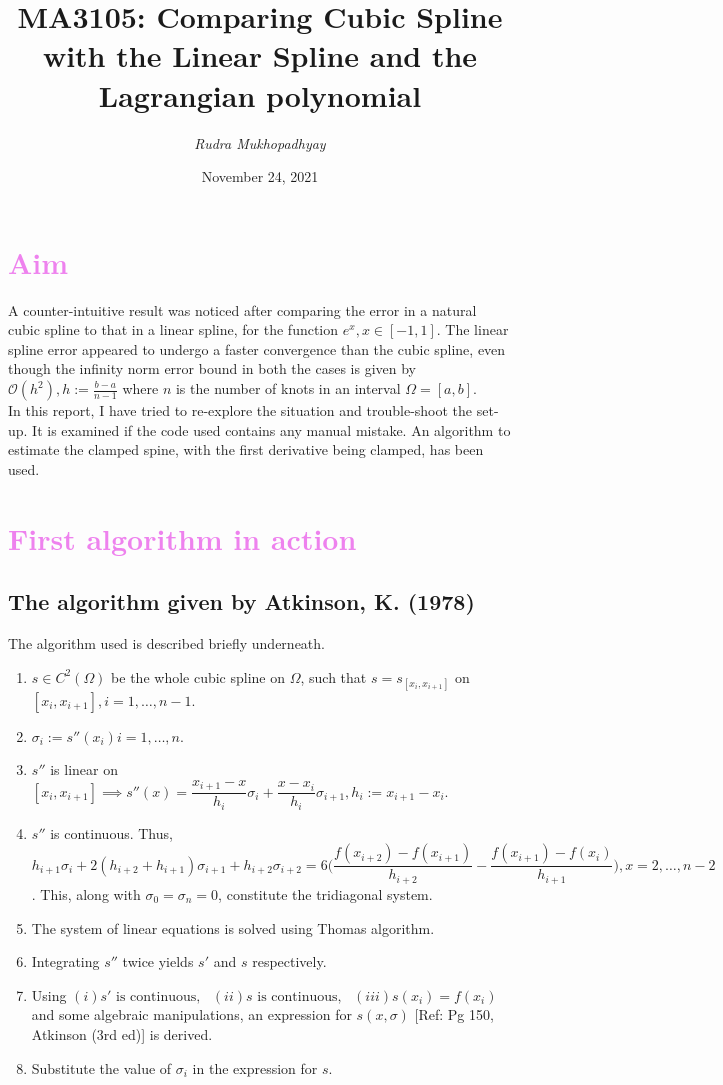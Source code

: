 \documentclass[12pt]{article}
\title{\textbf{MA3105: Comparing Cubic Spline with the Linear Spline and the Lagrangian polynomial}}
\author{\emph{Rudra Mukhopadhyay}}
\date{November 24, 2021}
\begin{document}
\maketitle

\tableofcontents

\section{\textcolor{violet}{Aim}}
A counter-intuitive result was noticed after comparing the error in a natural cubic spline to that in a linear spline, for the function $e^x, x\in [-1,1]$. The linear spline error appeared to undergo a faster convergence than the cubic spline, even though the infinity norm error bound in both the cases is given by $\mathcal{O}(h^2), h:=\frac{b-a}{n-1}$ where $n$ is the number of knots in an interval $\Omega = [a,b]$.\\
In this report, I have tried to re-explore the situation and trouble-shoot the set-up. It is examined if the code used contains any manual mistake. An algorithm to estimate the clamped spine, with the first derivative being clamped, has been used.  

\section{\textcolor{violet}{First algorithm in action}}
\subsection{The algorithm given by Atkinson, K. (1978)}
The algorithm used is described briefly underneath.
\begin{enumerate}[itemsep = -4 pt]
    \item $s \in C^2(\Omega)$ be the whole cubic spline on $\Omega$, such that $s = s_{[x_i, x_{i+1}]}$ on $[x_i, x_{i+1}], i = 1, \dots, n-1$.
    \item $\sigma_i := s''(x_i) i = 1, \dots, n$.
    \item $s''$ is linear on $[x_i, x_{i+1}] \implies s''(x) = \dfrac{x_{i+1}-x}{h_i}\sigma_i + \dfrac{x-x_i}{h_i}\sigma_{i+1}, h_i:=x_{i+1}-x_i$.
    \item $s''$ is continuous. Thus, $
    h_{i+1} \sigma_i + 2(h_{i+2} + h_{i+1})\sigma_{i+1} + h_{i+2}\sigma_{i+2} =6\Big(\dfrac{f(x_{i+2})-f(x_{i+1})}{h_{i+2}}-\dfrac{f(x_{i+1})-f(x_i)}{h_{i+1}}\Big), x = 2,\dots ,n-2$. This, along with $\sigma_0 = \sigma_{n} = 0$, constitute the tridiagonal system.
    \item The system of linear equations is solved using Thomas algorithm.
    \item Integrating $s''$ twice yields $s'$ and $s$ respectively.
    \item Using $(i) s' \text{ is continuous}, \text{ }(ii) s \text{ is continuous}, \text{ }(iii) s(x_i) = f(x_i)$ and some algebraic manipulations, an expression for $s(x, \sigma)$ [Ref: Pg 150, Atkinson (3rd ed)] is derived.
    \item Substitute the value of $\sigma_i$ in the expression for $s$.
\end{enumerate}
\end{document}
